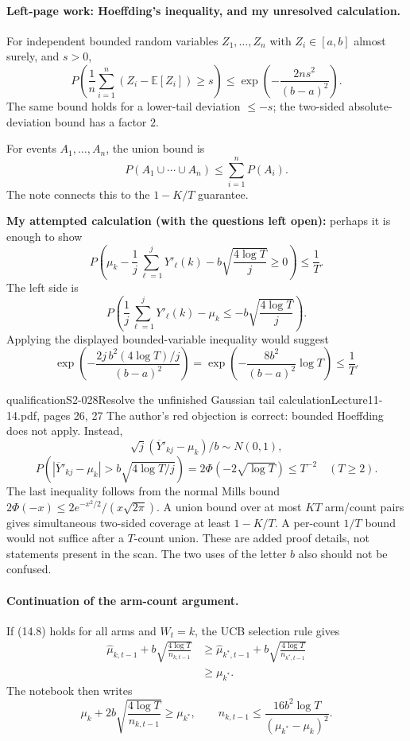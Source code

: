 \paragraph{Left-page work: Hoeffding's inequality, and my unresolved calculation.}
For independent bounded random variables $Z_1,\ldots,Z_n$ with $Z_i\in[a,b]$ almost surely, and $s>0$,
\[
 P\left(\frac1n\sum_{i=1}^n(Z_i-\mathbb E[Z_i])\ge s\right)
 \le\exp\left(-\frac{2ns^2}{(b-a)^2}\right).
\]
The same bound holds for a lower-tail deviation $\le-s$; the two-sided absolute-deviation bound has a factor $2$. 

For events $A_1,\ldots,A_n$, the union bound is
\[
 P(A_1\cup\cdots\cup A_n)\le\sum_{i=1}^nP(A_i).
\]
The note connects this to the $1-K/T$ guarantee.

\textbf{My attempted calculation (with the questions left open):} perhaps it is enough to show
\[
 P\left(\mu_k-\frac1j\sum_{\ell=1}^jY'_\ell(k)
 -b\sqrt{\frac{4\log T}{j}}\ge0\right)\le\frac1T.
\]
The left side is
\[
 P\left(\frac1j\sum_{\ell=1}^jY'_\ell(k)-\mu_k
 \le-b\sqrt{\frac{4\log T}{j}}\right).
\]
Applying the displayed bounded-variable inequality would suggest
\[
 \exp\left(-\frac{2j\,b^2(4\log T)/j}{(b-a)^2}\right)
 =\exp\left(-\frac{8b^2}{(b-a)^2}\log T\right)
 \le\frac1T.
\]

\begin{reviewnote}{qualification}{S2-028}{Resolve the unfinished Gaussian tail calculation}{Lecture11-14.pdf, pages 26, 27}
The author's red objection is correct: bounded Hoeffding does not apply. Instead,
\[
 \sqrt j(\overline Y'_{kj}-\mu_k)/b\sim N(0,1),
\]
\[
 P\left(|\overline Y'_{kj}-\mu_k|>b\sqrt{4\log T/j}\right)
 =2\Phi(-2\sqrt{\log T})\le T^{-2}\quad(T\ge2).
\]
The last inequality follows from the normal Mills bound $2\Phi(-x)\le2e^{-x^2/2}/(x\sqrt{2\pi})$. A union bound over at most $KT$ arm/count pairs gives simultaneous two-sided coverage at least $1-K/T$. A per-count $1/T$ bound would not suffice after a $T$-count union. These are added proof details, not statements present in the scan. The two uses of the letter $b$ also should not be confused.
\end{reviewnote}


\paragraph{Continuation of the arm-count argument.}
If (14.8) holds for all arms and $W_t=k$, the UCB selection rule gives
\begin{align*}
 \widehat\mu_{k,t-1}+b\sqrt{\frac{4\log T}{n_{k,t-1}}}
 &\ge\widehat\mu_{k^*,t-1}+b\sqrt{\frac{4\log T}{n_{k^*,t-1}}}\\
 &\ge\mu_{k^*}.
\end{align*}
The notebook then writes
\[
 \mu_k+2b\sqrt{\frac{4\log T}{n_{k,t-1}}}\ge\mu_{k^*},
 \qquad
 n_{k,t-1}\le\frac{16b^2\log T}{(\mu_{k^*}-\mu_k)^2}.
\]

